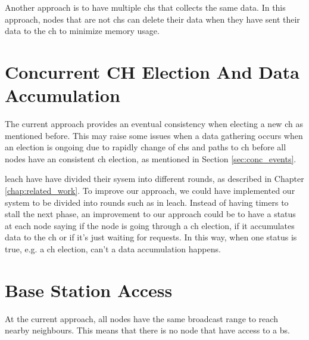 \documentclass[USenglish]{uit-thesis}
\begin{document}
Another approach is to have multiple \glspl{ch} that collects the same data. In this approach, nodes that are not \glspl{ch} can delete their data when they have sent their data to the \gls{ch} to minimize memory usage.




\section{Concurrent CH Election And Data Accumulation} \label{disc:simult_el_acc}
The current approach provides an eventual consistency when electing a new \gls{ch} as mentioned before. This may raise some issues when a data gathering occurs when an election is ongoing due to rapidly change of \gls{ch}s and paths to \gls{ch} before all nodes have an consistent \gls{ch} election, as mentioned in Section \ref{sec:conc_events}.


\gls{leach} have have divided their sysem into different rounds, as described in Chapter \ref{chap:related_work}. To improve our approach, we could have implemented our system to be divided into rounds such as in \gls{leach}. Instead of having timers to stall the next phase, an improvement to our approach could be to have a status at each node saying if the node is going through a \gls{ch} election, if it accumulates data to the \gls{ch} or if it's just waiting for requests. In this way, when one status is true, e.g. a \gls{ch} election, can't a data accumulation happens.






\section{Base Station Access} \label{disc:bs_acc}
At the current approach, all nodes have the same broadcast range to reach nearby neighbours. This means that there is no node that have access to a \gls{bs}.
\end{document}
